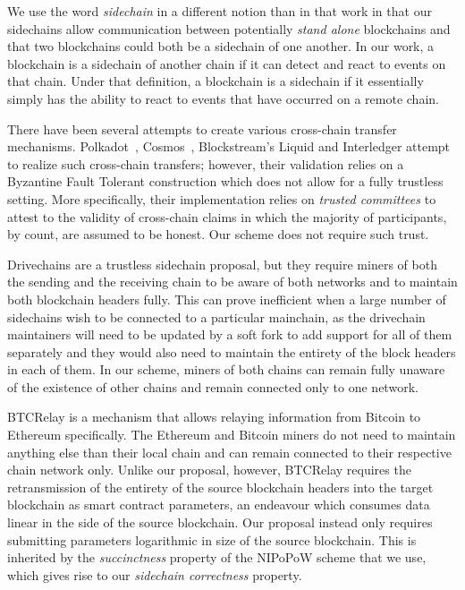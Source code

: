 We use the word \emph{sidechain} in a different notion than in that work in that
our sidechains allow communication between potentially \emph{stand alone}
blockchains and that two blockchains could both be a sidechain of one another.
In our work, a blockchain is a sidechain of another chain if it can detect and
react to events on that chain. Under that definition, a blockchain is a
sidechain if it essentially simply has the ability to react to events that have
occurred on a remote chain.

There have been several attempts to create various cross-chain transfer
mechanisms. Polkadot~\cite{wood2016polkadot},
Cosmos~\cite{buchman2016tendermint}, Blockstream's Liquid and Interledger
attempt to realize such cross-chain transfers; however, their validation relies
on a Byzantine Fault Tolerant construction which does not allow for a fully
trustless setting. More specifically, their implementation relies on
\emph{trusted committees} to attest to the validity of cross-chain claims in
which the majority of participants, by count, are assumed to be honest. Our
scheme does not require such trust.

Drivechains are a trustless sidechain proposal, but they require miners of both
the sending and the receiving chain to be aware of both networks and to maintain
both blockchain headers fully. This can prove inefficient when a large number of
sidechains wish to be connected to a particular mainchain, as the drivechain
maintainers will need to be updated by a soft fork to add support for all of
them separately and they would also need to maintain the entirety of the block
headers in each of them. In our scheme, miners of both chains can remain fully
unaware of the existence of other chains and remain connected only to one
network.

BTCRelay is a mechanism that allows relaying information from Bitcoin to
Ethereum specifically. The Ethereum and Bitcoin miners do not need to maintain
anything else than their local chain and can remain connected to their
respective chain network only. Unlike our proposal, however, BTCRelay requires
the retransmission of the entirety of the source blockchain headers into the
target blockchain as smart contract parameters, an endeavour which consumes data
linear in the side of the source blockchain. Our proposal instead only requires
submitting parameters logarithmic in size of the source blockchain. This is
inherited by the \emph{succinctness} property of the NIPoPoW scheme that we use,
which gives rise to our \emph{sidechain correctness} property.
